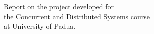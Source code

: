 Report on the project developed for
\\
the Concurrent and Distributed Systems course
\\
at University of Padua.
